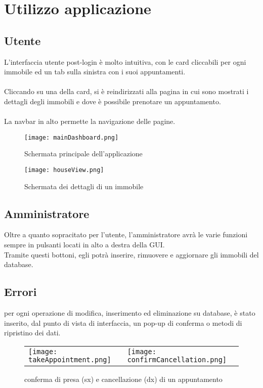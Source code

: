 \section{Utilizzo applicazione}
\subsection{Utente}
\noindent L'interfaccia utente post-login è molto intuitiva, con le card cliccabili per ogni immobile ed un tab sulla sinistra con i suoi appuntamenti.\\
\\
Cliccando su una della card, si è reindirizzati alla pagina in cui sono mostrati i dettagli degli immobili e dove  è possibile prenotare un appuntamento.\\
\\
La navbar in alto permette la navigazione delle pagine.

\begin{figure}[htbp]
    \centering
    \texttt{[image: mainDashboard.png]}
    \caption{Schermata principale dell'applicazione}
\end{figure}
\begin{figure}[htbp]
    \centering
    \texttt{[image: houseView.png]}
    \caption{Schermata dei dettagli di un immobile}
\end{figure}

\subsection{Amministratore}
\noindent Oltre a quanto sopracitato per l'utente, l'amministratore avrà le varie funzioni sempre in pulsanti locati in alto a destra della GUI.\\
Tramite questi bottoni, egli potrà inserire, rimuovere e aggiornare gli immobili del database.\\

\subsection{Errori}
\noindent per ogni operazione di modifica, inserimento ed eliminazione su database, è stato inserito, dal punto di vista di interfaccia, un pop-up di conferma o metodi di ripristino dei dati.

\begin{figure}[h]
\begin{tabular}{ll}
\texttt{[image: takeAppointment.png]}
&
\texttt{[image: confirmCancellation.png]}
\end{tabular}
\caption{conferma di presa (sx) e cancellazione (dx) di un appuntamento}
\label{Fig:Race}
\end{figure}